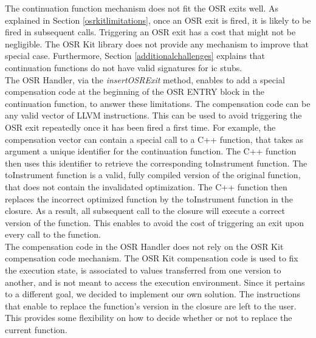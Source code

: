 The continuation function mechanism does not fit the OSR exits well.
As explained in Section \ref{osrkitlimitations}, once an OSR exit is fired, it is likely to be fired in subsequent calls.
Triggering an OSR exit has a cost that might not be negligible.
The OSR Kit\cite{OSRKit} library does not provide any mechanism to improve that special case.
Furthermore, Section \ref{additionalchallenges} explains that continuation functions do not have valid signatures for ic stubs.\\

The OSR Handler, via the \textit{insertOSRExit} method, enables to add a special compensation code at the beginning of the OSR ENTRY block in the continuation function, to answer these limitations.
The compensation code can be any valid vector of LLVM instructions.
This can be used to avoid triggering the OSR exit repeatedly once it has been fired a first time.
For example, the compensation vector can contain a special call to a C++ function, that takes as argument a unique identifier for the continuation function. 
The C++ function then uses this identifier to retrieve the corresponding toInstrument function.
The toInstrument function is a valid, fully compiled version of the original function, that does not contain the invalidated optimization.
The C++ function then replaces the incorrect optimized function by the toInstrument function in the closure.
As a result, all subsequent call to the closure will execute a correct version of the function.
This enables to avoid the cost of triggering an exit upon every call to the function.\\

The compensation code in the OSR Handler does not rely on the OSR Kit compensation code mechanism.
The OSR Kit compensation code is used to fix the execution state, is associated to values transferred from one version to another, and is not meant to access the execution environment.
Since it pertains to a different goal, we decided to implement our own solution.
The instructions that enable to replace the function's version in the closure are left to the user. 
This provides some flexibility on how to decide whether or not to replace the current function.\\


